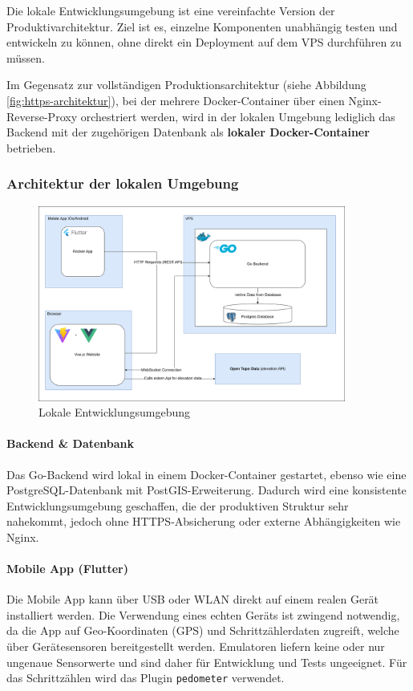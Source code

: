 \documentclass[11pt,a4paper]{article}
\begin{document}
Die lokale Entwicklungsumgebung ist eine vereinfachte Version der Produktivarchitektur. Ziel ist es, einzelne Komponenten unabhängig testen und entwickeln zu können, ohne direkt ein Deployment auf dem VPS durchführen zu müssen.

Im Gegensatz zur vollständigen Produktionsarchitektur (siehe Abbildung \ref{fig:https-architektur}), bei der mehrere Docker-Container über einen Nginx-Reverse-Proxy orchestriert werden, wird in der lokalen Umgebung lediglich das Backend mit der zugehörigen Datenbank als \textbf{lokaler Docker-Container} betrieben.

\subsubsection{Architektur der lokalen Umgebung}
\begin{figure}[H]
    \centering
    \includegraphics[width=0.9\textwidth]{images/Architecture.png}
    \caption{Lokale Entwicklungsumgebung}
    \label{fig:local-architektur}
\end{figure}

\paragraph{Backend \& Datenbank}
Das Go-Backend wird lokal in einem Docker-Container\cite{docker} gestartet, ebenso wie eine PostgreSQL-Datenbank\cite{postgresql} mit PostGIS-Erweiterung. Dadurch wird eine konsistente Entwicklungsumgebung geschaffen, die der produktiven Struktur sehr nahekommt, jedoch ohne HTTPS-Absicherung oder externe Abhängigkeiten wie Nginx\cite{nginx}.

\paragraph{Mobile App (Flutter)}
Die Mobile App kann über USB oder WLAN direkt auf einem realen Gerät installiert werden. Die Verwendung eines echten Geräts ist zwingend notwendig, da die App auf Geo-Koordinaten (GPS) und Schrittzählerdaten zugreift, welche über Gerätesensoren bereitgestellt werden. Emulatoren liefern keine oder nur ungenaue Sensorwerte und sind daher für Entwicklung und Tests ungeeignet. Für das Schrittzählen wird das Plugin \texttt{pedometer}\cite{pedometer} verwendet.
\end{document}

